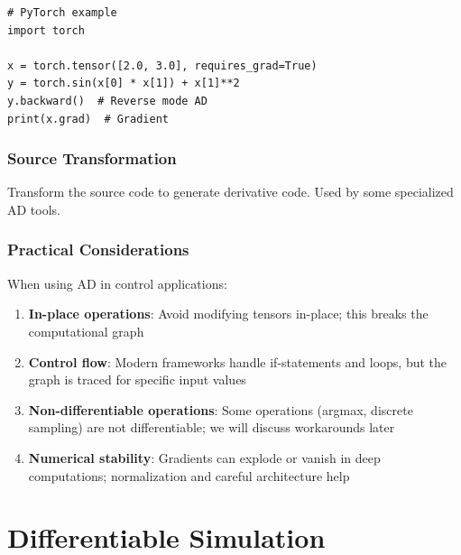 \begin{verbatim}
# PyTorch example
import torch

x = torch.tensor([2.0, 3.0], requires_grad=True)
y = torch.sin(x[0] * x[1]) + x[1]**2
y.backward()  # Reverse mode AD
print(x.grad)  # Gradient
\end{verbatim}

\subsubsection{Source Transformation}

Transform the source code to generate derivative code. Used by some specialized AD tools.

\subsubsection{Practical Considerations}

When using AD in control applications:

\begin{enumerate}
    \item \textbf{In-place operations}: Avoid modifying tensors in-place; this breaks the computational graph
    \item \textbf{Control flow}: Modern frameworks handle if-statements and loops, but the graph is traced for specific input values
    \item \textbf{Non-differentiable operations}: Some operations (argmax, discrete sampling) are not differentiable; we will discuss workarounds later
    \item \textbf{Numerical stability}: Gradients can explode or vanish in deep computations; normalization and careful architecture help
\end{enumerate}


\section{Differentiable Simulation}
\label{sec:diff_sim}

